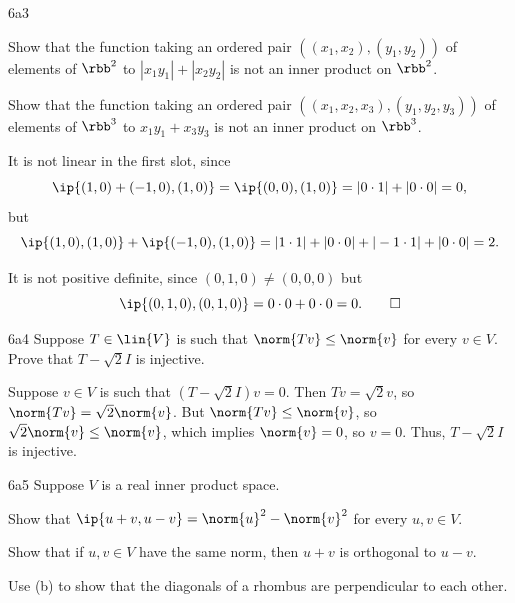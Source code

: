 \begin{exercise}{6a3}
    \begin{subexercises}
        \item Show that the function taking an ordered pair $((x_1, x_2), (y_1, y_2))$ of elements of $\rbb^2$ to $|x_1 y_1| + |x_2 y_2|$ is not an inner product on $\rbb^2$.
        \item Show that the function taking an ordered pair $((x_1, x_2, x_3), (y_1, y_2, y_3))$ of elements of $\rbb^3$ to $x_1 y_1 + x_3 y_3$ is not an inner product on $\rbb^3$.
    \end{subexercises}
\end{exercise}

\begin{solenum}
    \item It is not linear in the first slot, since
    \[
        \ip{(1, 0) + (-1, 0), (1, 0)} = \ip{(0, 0), (1, 0)} = |0 \cdot 1| + |0 \cdot 0| = 0,
    \]
    but
    \[
        \ip{(1, 0), (1, 0)} + \ip{(-1, 0), (1, 0)} = |1 \cdot 1| + |0 \cdot 0| + |-1 \cdot 1| + |0 \cdot 0| = 2.
    \]
    \item It is not positive definite, since $(0, 1, 0) \neq (0, 0, 0)$ but
    \[
        \ip{(0, 1, 0), (0, 1, 0)} = 0 \cdot 0 + 0 \cdot 0 = 0. \qedhere
    \]
\end{solenum}

\begin{exercise}{6a4}
    Suppose $T \in \lin{V}$ is such that $\norm{Tv} \leq \norm{v}$ for every $v \in V$.
    Prove that $T - \sqrt{2}I$ is injective.
\end{exercise}

\begin{sol}
    Suppose $v \in V$ is such that $(T - \sqrt{2}I)v = 0$.
    Then $Tv = \sqrt{2}v$, so $\norm{Tv} = \sqrt{2}\norm{v}$.
    But $\norm{Tv} \leq \norm{v}$, so $\sqrt{2}\norm{v} \leq \norm{v}$, which implies $\norm{v} = 0$, so $v = 0$.
    Thus, $T - \sqrt{2}I$ is injective.
\end{sol}

\begin{exercise}{6a5}
    Suppose $V$ is a real inner product space.
    \begin{subexercises}
        \item Show that $\ip{u + v, u - v} = \norm{u}^2 - \norm{v}^2$ for every $u, v \in V$.
        \item Show that if $u, v \in V$ have the same norm, then $u + v$ is orthogonal to $u - v$.
        \item Use (b) to show that the diagonals of a rhombus are perpendicular to each other.
    \end{subexercises}
\end{exercise}

